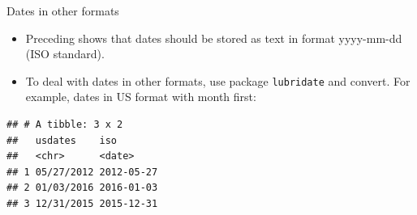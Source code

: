 \documentclass[
  ignorenonframetext,
]{beamer}
\newenvironment{Shaded}{\begin{snugshade}}{\end{snugshade}}
\newcommand{\DataTypeTok}[1]{\textcolor[rgb]{0.13,0.29,0.53}{#1}}
\newcommand{\KeywordTok}[1]{\textcolor[rgb]{0.13,0.29,0.53}{\textbf{#1}}}
\newcommand{\NormalTok}[1]{#1}
\newcommand{\OperatorTok}[1]{\textcolor[rgb]{0.81,0.36,0.00}{\textbf{#1}}}
\newcommand{\StringTok}[1]{\textcolor[rgb]{0.31,0.60,0.02}{#1}}
\providecommand{\tightlist}{%
  \setlength{\itemsep}{0pt}\setlength{\parskip}{0pt}}
\begin{document}
\begin{frame}[fragile]{Dates in other formats}
\protect\hypertarget{dates-in-other-formats}{}

\begin{itemize}
\tightlist
\item
  Preceding shows that dates should be stored as text in format
  yyyy-mm-dd (ISO standard).
\item
  To deal with dates in other formats, use package \texttt{lubridate}
  and convert. For example, dates in US format with month first:
\end{itemize}

\begin{Shaded}
\end{Shaded}

\begin{verbatim}
## # A tibble: 3 x 2
##   usdates    iso       
##   <chr>      <date>    
## 1 05/27/2012 2012-05-27
## 2 01/03/2016 2016-01-03
## 3 12/31/2015 2015-12-31
\end{verbatim}

\end{frame}
\end{document}
